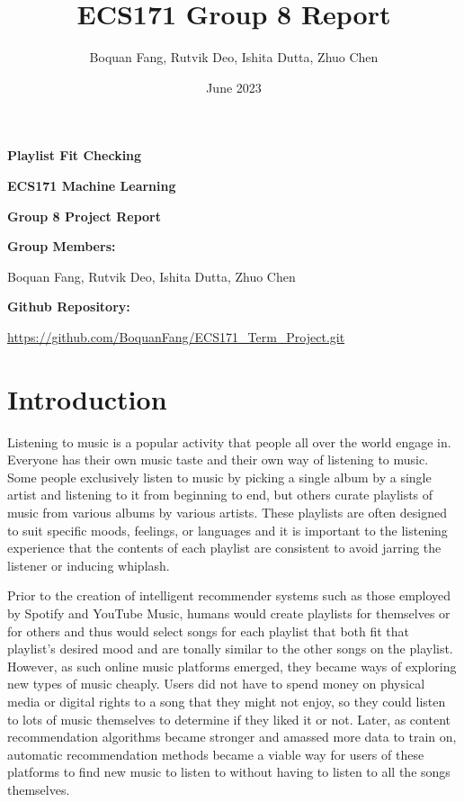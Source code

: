 \documentclass[titlepage]{article}
\title{ECS171 Group 8 Report}
\author{Boquan Fang, Rutvik Deo, Ishita Dutta, Zhuo Chen}
\date{June 2023}
\begin{document}
\begin{titlepage}
    \begin{center}
        \vspace*{6cm}

        \Huge
        \textbf{Playlist Fit Checking}

        \vspace{0.5cm}

        \LARGE
        \textbf{ECS171 Machine Learning}

        \textbf{Group 8 Project Report}

        \vspace{0.5cm}

        \Large
        \textbf{Group Members:}

        Boquan Fang, Rutvik Deo, Ishita Dutta, Zhuo Chen

        \vspace{0.5cm}

        \textbf{Github Repository:}

        \url{https://github.com/BoquanFang/ECS171_Term_Project.git}

        \vspace*{\fill}
    \end{center}
\end{titlepage}




\section{Introduction}
Listening to music is a popular activity that people all over the world engage in. 
Everyone has their own music taste and their own way of listening to music.
Some people exclusively listen to music by picking a single album by a single artist 
and listening to it from beginning to end, but others curate playlists of music from
various albums by various artists. These playlists are often designed to suit specific
moods, feelings, or languages and it is important to the listening experience that the contents of
each playlist are consistent to avoid jarring the listener or inducing whiplash.

Prior to the creation of intelligent recommender systems such as those employed by 
Spotify and YouTube Music, humans would create playlists for themselves or for others
and thus would select songs for each playlist that both fit that playlist's desired mood
and are tonally similar to the other songs on the playlist. However, as such 
online music platforms emerged, they became ways of exploring new types of music cheaply.
Users did not have to spend money on physical media or digital rights to a song that they
might not enjoy, so they could listen to lots of music themselves to determine if they liked it
or not. Later, as content recommendation algorithms became stronger and amassed more data
to train on, automatic recommendation methods became a viable way for users of these platforms
to find new music to listen to without having to listen to all the songs themselves. 
\end{document}

